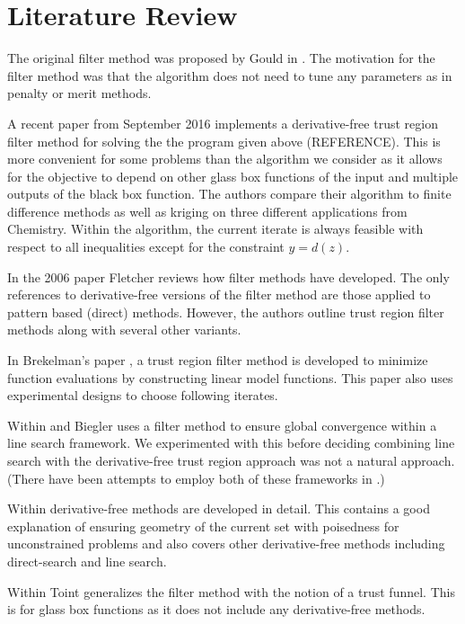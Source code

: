 \documentclass{article}
\begin{document}
\section{Literature Review}

The original filter method was proposed by Gould in \cite{DUMMY:original_filter}. The motivation for the filter method was that the algorithm does not need to tune any parameters as in penalty or merit methods.

A recent paper from September 2016 \cite{DUMMY:Biegler} implements a derivative-free trust region filter method for solving the the program given above (REFERENCE).
This is more convenient for some problems than the algorithm we consider as it allows for the objective to depend on other glass box functions of the input and multiple outputs of the black box function.
The authors compare their algorithm to finite difference methods as well as kriging on three different applications from Chemistry. Within the algorithm, the current iterate is always feasible with respect to all inequalities except for the constraint $y=d(z)$.


In the 2006 paper \cite{DUMMY:Fletcher} Fletcher reviews how filter methods have developed.
The only references to derivative-free versions of the filter method are those applied to pattern based (direct) methods.
However, the authors outline trust region filter methods along with several other variants.

In Brekelman's paper \cite{DUMMY:Brekelman}, a trust region filter method is developed to minimize function evaluations by constructing linear model functions.
This paper also uses experimental designs to choose following iterates.


Within \cite{DUMMY:linesearch_global} and \cite{DUMMY:linesearch_local} Biegler uses a filter method to ensure global convergence within a line search framework.
We experimented with this before deciding combining line search with the derivative-free trust region approach was not a natural approach. (There have been attempts to employ both of these frameworks in \cite{DUMMY:CombineTrustAndLine}.)


Within  \cite{DUMMY:intro_book} derivative-free methods are developed in detail.
This contains a good explanation of ensuring geometry of the current set with poisedness for unconstrained problems and also covers other derivative-free methods including direct-search and line search.


Within \cite{DUMMY:trust_funnel_dfo} Toint generalizes the filter method with the notion of a trust funnel.
This is for glass box functions as it does not include any derivative-free methods.
\end{document}
